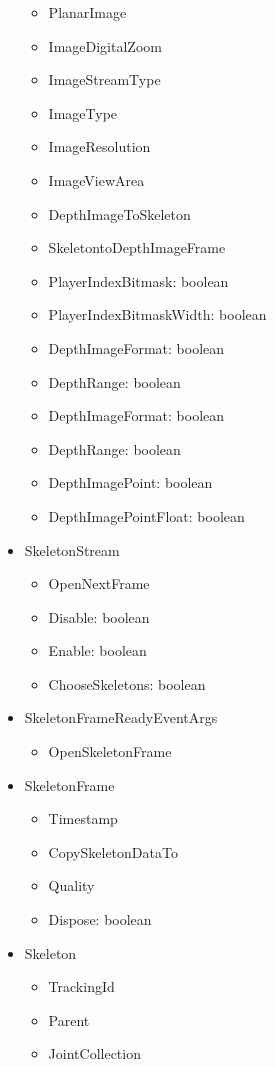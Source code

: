 \documentclass[11pt,a4paper]{article}
\begin{document}
\begin{itemize}
\begin{itemize}
	\item PlanarImage
	\item ImageDigitalZoom
	\item ImageStreamType
	\item ImageType
	\item ImageResolution
	\item ImageViewArea
	\item DepthImageToSkeleton
	\item SkeletontoDepthImageFrame
	\item PlayerIndexBitmask: boolean
	\item PlayerIndexBitmaskWidth: boolean
	\item DepthImageFormat: boolean
	\item DepthRange: boolean
	\item DepthImageFormat: boolean
	\item DepthRange: boolean
	\item DepthImagePoint: boolean
	\item DepthImagePointFloat: boolean
	\end{itemize}	 
\item SkeletonStream
	\begin{itemize}
	\item OpenNextFrame
	\item Disable: boolean
	\item Enable: boolean
	\item ChooseSkeletons: boolean
	\end{itemize} 
\item SkeletonFrameReadyEventArgs
	\begin{itemize}
	\item OpenSkeletonFrame
	\end{itemize}	
\item SkeletonFrame
	\begin{itemize}
	\item Timestamp
	\item CopySkeletonDataTo
	\item Quality
	\item Dispose: boolean
	\end{itemize}	
\item Skeleton
	\begin{itemize}
	\item TrackingId
	\item Parent
	\item JointCollection

\end{itemize}
\end{itemize}
\end{document}
